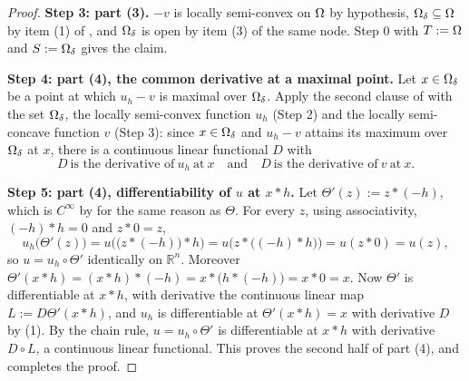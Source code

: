 \begin{proof}
\medskip\noindent\textbf{Step 3: part (3).} $-v$ is locally semi-convex on $\Omega$ by
hypothesis, $\Omega_\delta\subseteq\Omega$ by item (1) of , and
$\Omega_\delta$ is open by item (3) of the same node. Step 0 with $T:=\Omega$ and
$S:=\Omega_\delta$ gives the claim.

\medskip\noindent\textbf{Step 4: part (4), the common derivative at a maximal point.} Let
$x\in\Omega_\delta$ be a point at which $u_h-v$ is maximal over $\Omega_\delta$. Apply the second
clause of  with the set $\Omega_\delta$, the locally semi-convex
function $u_h$ (Step 2) and the locally semi-concave function $v$ (Step 3): since
$x\in\Omega_\delta$ and $u_h-v$ attains its maximum over $\Omega_\delta$ at $x$, there is a
continuous linear functional $D$ with
\[
 D\ \text{is the derivative of}\ u_h\ \text{at}\ x\quad\text{and}\quad
 D\ \text{is the derivative of}\ v\ \text{at}\ x . \tag{1}
\]

\medskip\noindent\textbf{Step 5: part (4), differentiability of $u$ at $x*h$.} Let
$\Theta'(z):=z*(-h)$, which is $C^{\infty}$ by  for the same reason as
$\Theta$. For every $z$, using associativity, $(-h)*h=0$ and $z*0=z$,
\[
 u_h\big(\Theta'(z)\big)=u\Big(\big(z*(-h)\big)*h\Big)=u\Big(z*\big((-h)*h\big)\Big)=u(z*0)=u(z),
\]
so $u=u_h\circ\Theta'$ identically on $\mathbb R^{n}$. Moreover
$\Theta'(x*h)=(x*h)*(-h)=x*\big(h*(-h)\big)=x*0=x$. Now $\Theta'$ is differentiable at
$x*h$, with derivative the continuous linear map $L:=D\Theta'(x*h)$, and $u_h$ is
differentiable at $\Theta'(x*h)=x$ with derivative $D$ by (1). By the chain rule,
$u=u_h\circ\Theta'$ is differentiable at $x*h$ with derivative $D\circ L$, a continuous
linear functional. This proves the second half of part (4), and completes the proof.
\end{proof}
